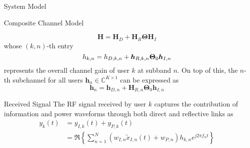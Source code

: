 \documentclass{IEEEtran}
\begin{document}
\begin{section} {System Model}
\begin{subsection}	{Composite Channel Model}


		\begin{equation}	\label{eq:H}
			\boldsymbol{H} = \boldsymbol{H}_D+\boldsymbol{H}_R\boldsymbol{\Theta}\boldsymbol{H}_I
		\end{equation}
		whose $(k,n)$-th entry
		\begin{equation}	\label{eq:h_{k,n}}
			h_{k,n}=h_{D,k,n}+\boldsymbol{h}_{R,k,n}\boldsymbol{\Theta}_0\boldsymbol{h}_{I,n}
		\end{equation}
		represents the overall channel gain of user $k$ at subband $n$. On top of this, the $n$-th subchannel for all users $\boldsymbol{h}_n \in \mathbb{C}^{K \times 1}$ can be expressed as
		\begin{equation}	\label{eq:h_n}
			\boldsymbol{h}_n=\boldsymbol{h}_{D,n}+\boldsymbol{H}_{R,n}\boldsymbol{\Theta}_0\boldsymbol{h}_{I,n}
		\end{equation}
	\end{subsection}

	\begin{subsection}	{Received Signal}
		The RF signal received by user $k$ captures the contribution of information and power waveforms through both direct and reflective links as
		\begin{equation}	\label{eq:y_k(t)}
			\begin{split}
				y_k(t)
				&=y_{I,k}(t)+y_{P,k}(t)	\\
				&=\Re\left\{{\sum_{n=1}^N{(w_{I,n}\tilde{x}_{I,n}(t)+w_{P,n})h_{k,n}e^{j2{\pi}{f_n}t}}}\right\}
			\end{split}
		\end{equation}


\end{subsection}
\end{section}
\end{document}
